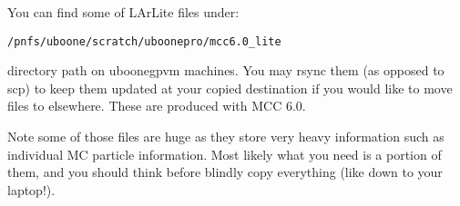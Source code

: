 
You can find some of LArLite files under:
\begin{lstlisting}
/pnfs/uboone/scratch/uboonepro/mcc6.0_lite
\end{lstlisting}
directory path on {\ttfamily uboonegpvm} machines.
You may {\ttfamily rsync} them (as opposed to {\ttfamily scp}) to keep them
updated at your copied destination if you would like to move files to elsewhere.
These are produced with MCC 6.0.

Note some of those files are huge as they store very heavy information such as individual MC particle information.
Most likely what you need is a portion of them, and you should think before
blindly copy everything (like down to your laptop!).
